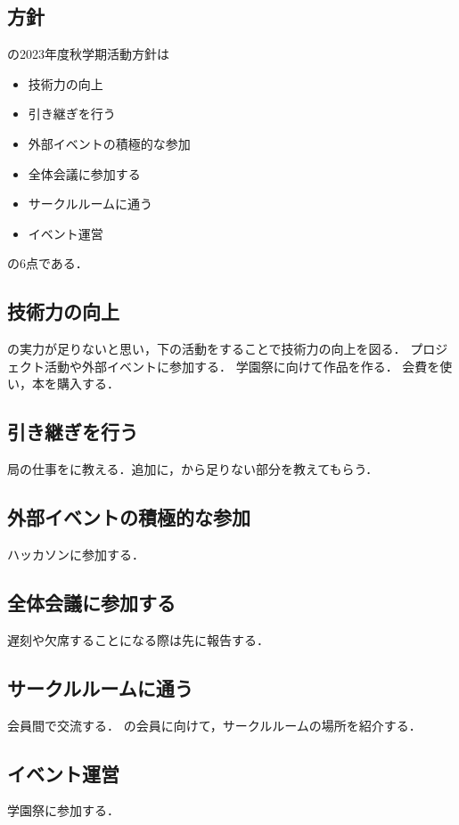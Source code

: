 \subsection*{\newGradeIfKouki{}\secondGrade{}方針}


\secondGrade{}の2023年度秋学期活動方針は
\begin{itemize}
    \item 技術力の向上
    \item 引き継ぎを行う
    \item 外部イベントの積極的な参加
    \item 全体会議に参加する
    \item サークルルームに通う
    \item イベント運営
\end{itemize}
の6点である．

\subsection*{技術力の向上}
\secondGrade{}の実力が足りないと思い，下の活動をすることで技術力の向上を図る．
プロジェクト活動や外部イベントに参加する．
学園祭に向けて作品を作る．
会費を使い，本を購入する．

\subsection*{引き継ぎを行う}
局の仕事を\firstGrade{}に教える．追加に，\thirdGrade{}から足りない部分を教えてもらう．

\subsection*{外部イベントの積極的な参加}
ハッカソンに参加する．

\subsection*{全体会議に参加する}
遅刻や欠席することになる際は先に報告する．

\subsection*{サークルルームに通う}
会員間で交流する．
\firstGrade{}の会員に向けて，サークルルームの場所を紹介する．

\subsection*{イベント運営}
学園祭に参加する．
